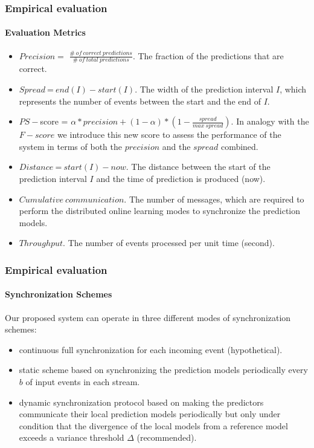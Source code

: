 
\begin{frame}
	
	\frametitle{Empirical evaluation}
	\framesubtitle{Evaluation Metrics}
	
	\begin{itemize}	
		\item<only@1>  $\mathit{Precision} =$ $ \mathit{\frac{\#\ of\ correct\ predictions}{\#\ of\ total\ predictions}}$. The fraction of the predictions that are correct.     
		\item<only@1> $\mathit{Spread}\ $=$\ end(I) -start(I)$. The width of the prediction interval $I$, which represents the number of events between the start and the end of $I$.
	
		\item<only@1> $\mathit{PS-}$score = $\alpha * precision + (1 - \alpha ) * ( 1- \frac{spread}{max\  spread})$. In analogy with the $F-score$ we introduce this new score to assess the performance of the system in terms of both the $\mathit{precision}$ and the $\mathit{spread}$ combined.
		\item<only@1> $\mathit{Distance}\ $=$\ start(I) - now$. The distance between the start of the prediction interval $I$ and the time of prediction is produced (now). 
		\item<only@2>  $\mathit{Cumulative\ communication}$. The number of messages, which are required to perform the distributed online learning modes to synchronize the prediction models.	
		\item<only@2> $Throughput$. The number of events processed per unit time (second).
	\end{itemize} 
	
\end{frame}


\begin{frame}
	
	\frametitle{Empirical evaluation}
	\framesubtitle{Synchronization Schemes}
	
	Our proposed system can operate in three different modes of synchronization schemes: 
	\begin{itemize}	
		\item continuous full synchronization for each incoming event (hypothetical).
		\item static scheme based on synchronizing the prediction models periodically every $b$ of input events in each stream.
		\item dynamic synchronization protocol based on making the predictors communicate their local prediction models periodically but only under condition that the divergence of the local models from a reference model exceeds a variance threshold $\Delta$ (recommended).  	   
		
	\end{itemize} 
	
\end{frame}


